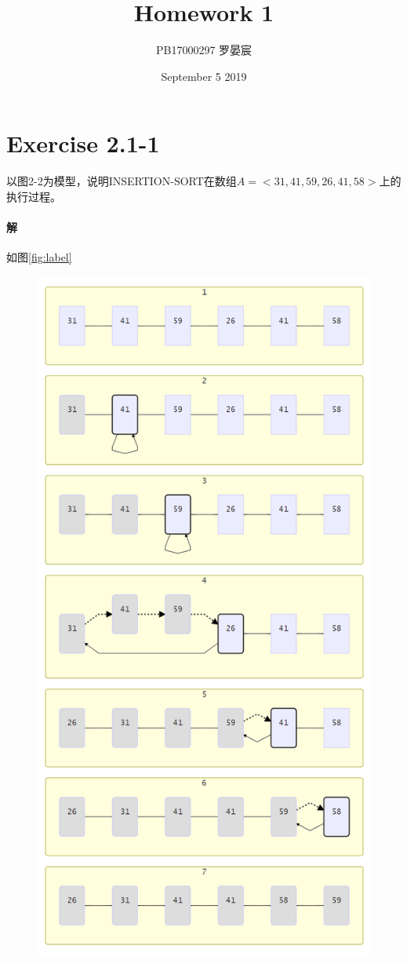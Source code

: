 \documentclass{article}
\title{Homework 1}
\author{PB17000297 罗晏宸}
\date{September 5 2019}
\begin{document}
\maketitle

\section{Exercise 2.1-1}
以图2-2为模型，说明INSERTION-SORT在数组$A=<31,41,59,26,41,58>$上的执行过程。\\
\par
\paragraph{解} 如图\ref{fig:label}

\begin{figure}
\centering
\includegraphics[scale=0.6]{Insertion-sort.png}

\end{figure}
\end{document}
